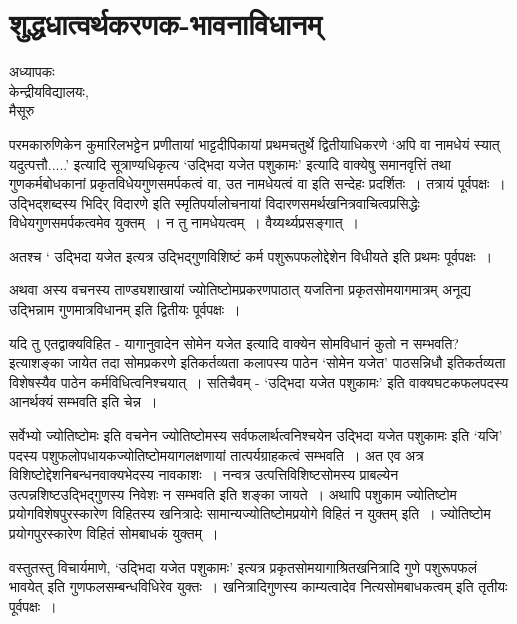 {\fontsize{15}{17}\selectfont
\chapter{शुद्धधात्वर्थकरणक-भावनाविधानम्}

\begin{center}
\smallskip

अध्यापकः\\
केन्द्रीयविद्यालयः,\\ 
मैसूरु
\addrule
\end{center}

परमकारुणिकेन कुमारिलभट्टेन प्रणीतायां भाट्टदीपिकायां प्रथमचतुर्थे द्वितीयाधिकरणे ‘अपि वा नामधेयं स्यात् यदुत्पत्तौ.....’ इत्यादि सूत्राण्यधिकृत्य ‘उद्भिदा यजेत पशुकामः’ इत्यादि वाक्येषु समानवृत्तिं तथा गुणकर्मबोधकानां प्रकृतविधेयगुणसमर्पकत्वं वा, उत नामधेयत्वं वा इति सन्देहः प्रदर्शितः~। तत्रायं पूर्वपक्षः~। उद्भिद्शब्दस्य भिदिर् विदारणे इति स्मृतिपर्यालोचनायां विदारणसमर्थखनित्रवाचित्वप्रसिद्धेः विधेयगुणसमर्पकत्वमेव युक्तम्~। न तु नामधेयत्वम्~। वैय्यर्थ्यप्रसङ्गात्~। 

अतश्च  ‘ उद्भिदा यजेत इत्यत्र उद्भिद्गुणविशिष्टं कर्म पशुरूपफलोद्देशेन विधीयते इति प्रथमः पूर्वपक्षः~। 

अथवा अस्य वचनस्य ताण्ड्यशाखायां ज्योतिष्टोमप्रकरणपाठात् यजतिना प्रकृतसोमयागमात्रम् अनूद्य उद्भिन्नाम गुणमात्रविधानम् इति द्वितीयः पूर्वपक्षः~। 

यदि तु एतद्वाक्यविहित - यागानुवादेन सोमेन यजेत इत्यादि वाक्येन सोमविधानं कुतो न सम्भवति? इत्याशङ्का जायेत तदा सोमप्रकरणे इतिकर्तव्यता कलापस्य पाठेन ‘सोमेन यजेत’ पाठसन्निधौ इतिकर्तव्यता विशेषस्यैव पाठेन कर्मविधित्वनिश्चयात्~। सतिचैवम् - ‘उद्भिदा यजेत पशुकामः’ इति वाक्यघटकफलपदस्य आनर्थक्यं सम्भवति इति चेन्न~। 

सर्वेभ्यो ज्योतिष्टोमः इति वचनेन ज्योतिष्टोमस्य सर्वफलार्थत्वनिश्चयेन उद्भिदा यजेत पशुकामः इति ‘यजि’ पदस्य  पशुफलोपधायकज्योतिष्टोमयागलक्षणायां तात्पर्यग्राहकत्वं सम्भवति~। अत एव अत्र विशिष्टोद्देशनिबन्धनवाक्यभेदस्य नावकाशः~। नन्वत्र उत्पत्तिविशिष्टसोमस्य प्राबल्येन उत्पन्नशिष्टउद्भिद्गुणस्य निवेशः न सम्भवति इति शङ्का जायते~। अथापि पशुकाम  ज्योतिष्टोम  प्रयोगविशेषपुरस्कारेण विहितस्य खनित्रादेः सामान्यज्योतिष्टोमप्रयोगे विहितं न युक्तम् इति~। ज्योतिष्टोम प्रयोगपुरस्कारेण विहितं सोमबाधकं युक्तम्~। 

वस्तुतस्तु विचार्यमाणे, ‘उद्भिदा यजेत पशुकामः’ इत्यत्र प्रकृतसोमयागाश्रितखनित्रादि गुणे पशुरूपफलं भावयेत् इति गुणफलसम्बन्धविधिरेव युक्तः~। खनित्रादिगुणस्य काम्यत्वादेव नित्यसोमबाधकत्वम् इति तृतीयः पूर्वपक्षः~। 

}
